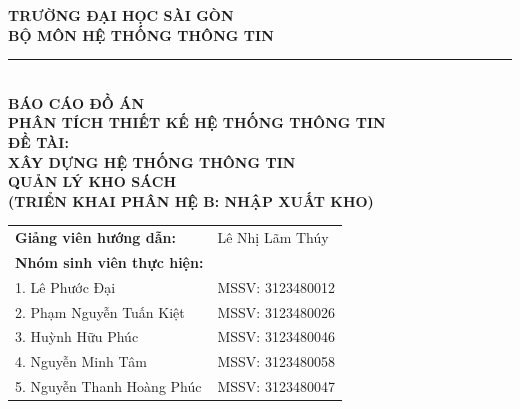 \documentclass[12pt,a4paper]{article}
\begin{document}
\begin{titlepage}

    \begin{center}
        \vspace*{0.2cm}
        {\large \textbf{TRƯỜNG ĐẠI HỌC SÀI GÒN}}\\[0.2cm]
       
        \textbf{BỘ MÔN HỆ THỐNG THÔNG TIN}\\[0.5cm]
        
        \rule{0.5\textwidth}{1pt}\\[1.5cm]

        {\large \textbf{BÁO CÁO ĐỒ ÁN}}\\[0.3cm]
        {\large \textbf{PHÂN TÍCH THIẾT KẾ HỆ THỐNG THÔNG TIN}}\\[1.2cm]

        {\Large \textbf{ĐỀ TÀI:}}\\[0.4cm]
        {\LARGE \textbf{XÂY DỰNG HỆ THỐNG THÔNG TIN}}\\[0.3cm]
        {\LARGE \textbf{QUẢN LÝ KHO SÁCH}}\\[0.4cm]
        {\large \textbf{(TRIỂN KHAI PHÂN HỆ B: NHẬP XUẤT KHO)}}\\[2.0cm]
    \end{center}

    \vfill

    \begin{flushleft}
        \hspace*{1.0cm}
        \begin{tabular}{ll}
            \textbf{Giảng viên hướng dẫn:} & Lê Nhị Lãm Thúy \\[0.4cm]
            \textbf{Nhóm sinh viên thực hiện:}  \\[0.2cm]
            1. Lê Phước Đại & MSSV: 3123480012 \\
            2. Phạm Nguyễn Tuấn Kiệt & MSSV: 3123480026 \\
            3. Huỳnh Hữu Phúc & MSSV: 3123480046 \\
            4. Nguyễn Minh Tâm & MSSV: 3123480058 \\
            5. Nguyễn Thanh Hoàng Phúc & MSSV: 3123480047 \\
        \end{tabular}
    \end{flushleft}


\end{titlepage}
\end{document}

